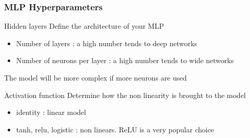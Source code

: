 \documentclass[11pt]{beamer}
\begin{document}
\begin{frame}[fragile]
  \frametitle{MLP Hyperparameters}

  \begin{block}{Hidden layers}
    Define the architecture of your MLP
    \begin{itemize}
    \item Number of layers : a high number tends to deep networks
    \item Number of neurons per layer : a high number tends to wide networks
    \end{itemize}
    The model will be more complex if more neurons are used
  \end{block}

  \begin{block}{Activation function}
    Determine how the non linearity is brought to the model
    \begin{itemize}
    \item identity : linear model
    \item tanh, relu, logistic : non linears. ReLU is a very popular choice
    \end{itemize}
  \end{block}

\end{frame}
\end{document}
